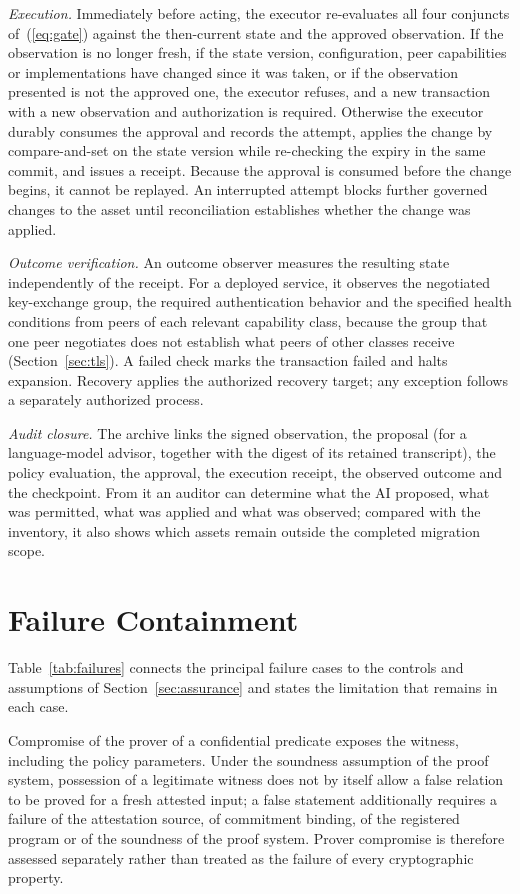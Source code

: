 \documentclass[journal]{IEEEtran}
\begin{document}
\emph{Execution.} Immediately before acting, the executor re-evaluates all four conjuncts of~(\ref{eq:gate}) against the then-current state and the approved observation. If the observation is no longer fresh, if the state version, configuration, peer capabilities or implementations have changed since it was taken, or if the observation presented is not the approved one, the executor refuses, and a new transaction with a new observation and authorization is required. Otherwise the executor durably consumes the approval and records the attempt, applies the change by compare-and-set on the state version while re-checking the expiry in the same commit, and issues a receipt. Because the approval is consumed before the change begins, it cannot be replayed. An interrupted attempt blocks further governed changes to the asset until reconciliation establishes whether the change was applied.

\emph{Outcome verification.} An outcome observer measures the resulting state independently of the receipt. For a deployed service, it observes the negotiated key-exchange group, the required authentication behavior and the specified health conditions from peers of each relevant capability class, because the group that one peer negotiates does not establish what peers of other classes receive~\cite{han} (Section~\ref{sec:tls}). A failed check marks the transaction failed and halts expansion. Recovery applies the authorized recovery target; any exception follows a separately authorized process.

\emph{Audit closure.} The archive links the signed observation, the proposal (for a language-model advisor, together with the digest of its retained transcript), the policy evaluation, the approval, the execution receipt, the observed outcome and the checkpoint. From it an auditor can determine what the AI proposed, what was permitted, what was applied and what was observed; compared with the inventory, it also shows which assets remain outside the completed migration scope.

\section{Failure Containment}
\label{s:failures}
Table~\ref{tab:failures} connects the principal failure cases to the controls and assumptions of Section~\ref{sec:assurance} and states the limitation that remains in each case.

Compromise of the prover of a confidential predicate exposes the witness, including the policy parameters. Under the soundness assumption of the proof system, possession of a legitimate witness does not by itself allow a false relation to be proved for a fresh attested input; a false statement additionally requires a failure of the attestation source, of commitment binding, of the registered program or of the soundness of the proof system. Prover compromise is therefore assessed separately rather than treated as the failure of every cryptographic property.
\end{document}
